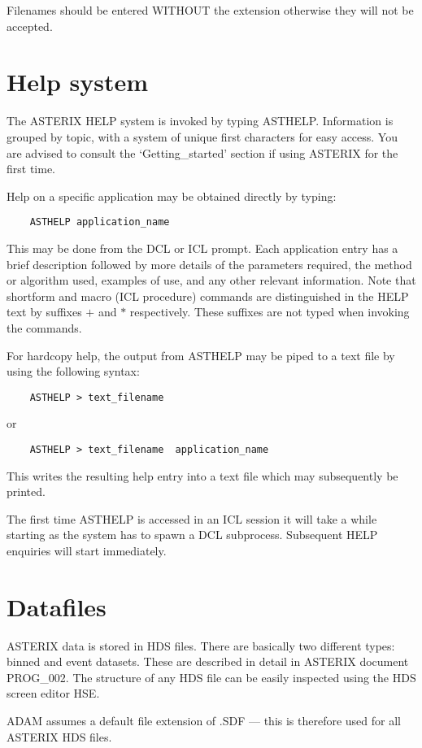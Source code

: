 Filenames should be entered WITHOUT the extension otherwise they will not be
accepted.

\section{Help system }

The ASTERIX HELP system is invoked by typing ASTHELP. Information is
grouped by topic, with a system of unique first characters for easy access.
You are advised to consult the `Getting\_started' section if using ASTERIX
for the first time.

Help on a specific application may be obtained directly by typing:
\begin{verbatim}
    ASTHELP application_name
\end{verbatim}
This may be done from the DCL or ICL prompt. Each application entry has a 
brief description followed by more details of the parameters required, the
method or algorithm used, examples of use, and any other relevant information.
Note that shortform and macro (ICL procedure) commands are distinguished in 
the HELP text by suffixes {\bf  } $+$ and $*$ respectively. These suffixes 
are not typed when invoking the commands. 

For hardcopy help, the output from ASTHELP may be piped to a text file by using
the following syntax: 
\begin{verbatim}
    ASTHELP > text_filename  
\end{verbatim}
or 
\begin{verbatim}
    ASTHELP > text_filename  application_name
\end{verbatim}
This writes the resulting help entry into a text file which
may subsequently be printed.

The first time ASTHELP is accessed in an ICL session it will take a while
starting as the system has to spawn a DCL subprocess. Subsequent HELP
enquiries will start immediately.

\section{Datafiles }

ASTERIX data is stored in HDS files. There are basically two different types:
binned and event datasets. These are described in detail in ASTERIX document
PROG\_002. The structure of any HDS file can be easily inspected using the HDS
screen editor HSE. 

ADAM assumes a default file extension of .SDF --- this is therefore used for 
all ASTERIX HDS files.

